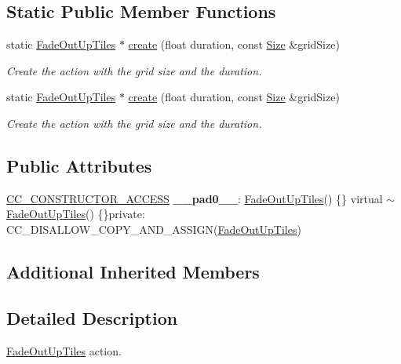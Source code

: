 \subsection*{Static Public Member Functions}
\begin{DoxyCompactItemize}
\item 
static \hyperlink{classFadeOutUpTiles}{Fade\+Out\+Up\+Tiles} $\ast$ \hyperlink{classFadeOutUpTiles_a77864d03a89dc07e615029f723f0356c}{create} (float duration, const \hyperlink{classSize}{Size} \&grid\+Size)
\begin{DoxyCompactList}\small\item\em Create the action with the grid size and the duration. \end{DoxyCompactList}\item 
static \hyperlink{classFadeOutUpTiles}{Fade\+Out\+Up\+Tiles} $\ast$ \hyperlink{classFadeOutUpTiles_a7afb384f50c3e2ca338c3c4b7905b4da}{create} (float duration, const \hyperlink{classSize}{Size} \&grid\+Size)
\begin{DoxyCompactList}\small\item\em Create the action with the grid size and the duration. \end{DoxyCompactList}\end{DoxyCompactItemize}
\subsection*{Public Attributes}
\begin{DoxyCompactItemize}
\item 
\mbox{\label{classFadeOutUpTiles_a456a00aab3b9a38131b4195452d4d54e}} 
\hyperlink{_2cocos2d_2cocos_2base_2ccConfig_8h_a25ef1314f97c35a2ed3d029b0ead6da0}{C\+C\+\_\+\+C\+O\+N\+S\+T\+R\+U\+C\+T\+O\+R\+\_\+\+A\+C\+C\+E\+SS} {\bfseries \+\_\+\+\_\+pad0\+\_\+\+\_\+}\+: \hyperlink{classFadeOutUpTiles}{Fade\+Out\+Up\+Tiles}() \{\} virtual $\sim$\hyperlink{classFadeOutUpTiles}{Fade\+Out\+Up\+Tiles}() \{\}private\+: C\+C\+\_\+\+D\+I\+S\+A\+L\+L\+O\+W\+\_\+\+C\+O\+P\+Y\+\_\+\+A\+N\+D\+\_\+\+A\+S\+S\+I\+GN(\hyperlink{classFadeOutUpTiles}{Fade\+Out\+Up\+Tiles})
\end{DoxyCompactItemize}
\subsection*{Additional Inherited Members}


\subsection{Detailed Description}
\hyperlink{classFadeOutUpTiles}{Fade\+Out\+Up\+Tiles} action. 

